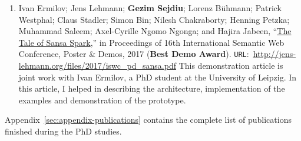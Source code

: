 \begin{itemize}
\begin{enumerate}
    \item Ivan Ermilov; Jens Lehmann; \textbf{Gezim Sejdiu}; Lorenz Bühmann; Patrick Westphal; Claus Stadler; Simon Bin; Nilesh Chakraborty; Henning Petzka; Muhammad Saleem; Axel-Cyrille Ngomo Ngonga; and Hajira Jabeen, “\href{http://jens-lehmann.org/files/2017/iswc_pd_sansa.pdf}{The Tale of Sansa Spark},” in Proceedings of 16th International Semantic Web Conference, Poster \& Demos, 2017 ({\color{darkred}\textbf{Best Demo Award}}). \texttt{URL}:~\url{http://jens-lehmann.org/files/2017/iswc_pd_sansa.pdf}
    This demonstration article is joint work with Ivan Ermilov, a PhD student at the University of Leipzig. 
    In this article, I helped in describing the architecture, implementation of the examples and demonstration of the prototype.
        
    \end{enumerate}
\end{itemize}

Appendix~\ref{sec:appendix-publications} contains the complete list of publications finished during the PhD studies.

